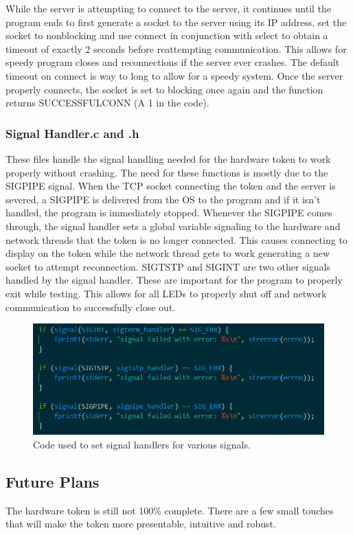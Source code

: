 \documentclass[a4paper,10pt]{article}
\begin{document}
While the server is attempting to connect to the server, it continues until the program ends to first generate a socket to the server using its IP address, set the socket to nonblocking and use connect in conjunction with select to obtain a timeout of exactly 2 seconds before reattempting communication. This allows for speedy program closes and reconnections if the server ever crashes. The default timeout on connect is way to long to allow for a speedy system. Once the server properly connects, the socket is set to blocking once again and the function returns SUCCESSFUL\textunderscore CONN (A 1 in the code).

\subsubsection{Signal Handler.c and .h}
These files handle the signal handling needed for the hardware token to work properly without crashing. The need for these functions is mostly due to the SIGPIPE signal. When the TCP socket connecting the token and the server is severed, a SIGPIPE is delivered from the OS to the program and if it isn't handled, the program is immediately stopped. Whenever the SIGPIPE comes through, the signal handler sets a global variable signaling to the hardware and network threads that the token is no longer connected. This causes connecting to display on the token while the network thread gets to work generating a new socket to attempt reconnection. SIGTSTP and SIGINT are two other signals handled by the signal handler. These are important for the program to properly exit while testing. This allows for all LEDs to properly shut off and network communication to successfully close out.

 \begin{figure}[H]
  \centering
      \includegraphics[width=\textwidth]{Assets/handlers.png}
  \caption{Code used to set signal handlers for various signals.}
\end{figure}

\subsection{Future Plans}
The hardware token is still not 100\% complete. There are a few small touches that will make the token more presentable, intuitive and robust. 
\end{document}

